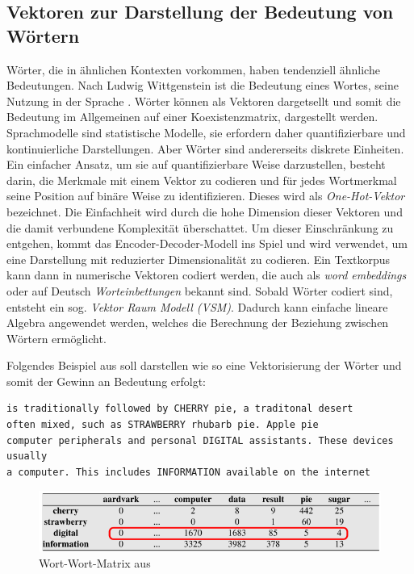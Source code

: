 \documentclass[
        ngerman,
        paper=a4,
        numbers=noendperiod,
]{scrreprt}
\begin{document}
\subsection{Vektoren zur Darstellung der Bedeutung von Wörtern}
Wörter, die in ähnlichen Kontexten vorkommen, haben tendenziell ähnliche Bedeutungen. Nach Ludwig Wittgenstein ist die Bedeutung eines Wortes, seine Nutzung in der Sprache \citep{wittgenstein2009philosophical}. Wörter können als Vektoren dargetsellt und somit die Bedeutung im Allgemeinen auf einer Koexistenzmatrix, dargestellt werden. Sprachmodelle sind statistische Modelle, sie erfordern daher quantifizierbare und kontinuierliche Darstellungen. Aber Wörter sind andererseits diskrete Einheiten. Ein einfacher Ansatz, um sie auf quantifizierbare Weise darzustellen, besteht darin, die Merkmale mit einem Vektor zu codieren und für jedes Wortmerkmal seine Position auf binäre Weise zu identifizieren. Dieses wird als \textit{One-Hot-Vektor} bezeichnet. Die Einfachheit wird durch die hohe Dimension dieser Vektoren und die damit verbundene Komplexität überschattet. Um dieser Einschränkung zu entgehen, kommt das Encoder-Decoder-Modell ins Spiel und wird verwendet, um eine Darstellung mit reduzierter Dimensionalität zu codieren. Ein Textkorpus kann dann in numerische Vektoren codiert werden, die auch als \textit{word embeddings} oder auf Deutsch \textit{Worteinbettungen} bekannt sind. Sobald Wörter codiert sind, entsteht ein sog. \textit{Vektor Raum Modell (VSM)}. Dadurch kann einfache lineare Algebra angewendet werden, welches die Berechnung der Beziehung zwischen Wörtern ermöglicht.

Folgendes Beispiel aus \citep[S. 105]{Jurafsky2014SpeechProcessing} soll darstellen wie so eine Vektorisierung der Wörter und somit der Gewinn an Bedeutung erfolgt:

\begin{verbatim}
is traditionally followed by CHERRY pie, a traditonal desert 
often mixed, such as STRAWBERRY rhubarb pie. Apple pie
computer peripherals and personal DIGITAL assistants. These devices usually
a computer. This includes INFORMATION available on the internet
\end{verbatim}

\begin{figure}[H]
    \centering\includegraphics[width=0.6\linewidth]{images/mat.png}
    \caption[Wort-Wort-Matrix]{Wort-Wort-Matrix aus \citep[S. 105]{Jurafsky2014SpeechProcessing}}
    \label{fig:mat}
\end{figure}
\end{document}
